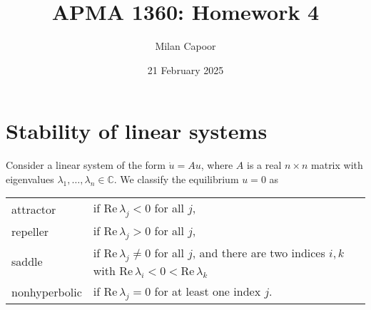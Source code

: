 \documentclass[12pt]{article}
\title{APMA 1360: Homework 4}
\author{Milan Capoor}
\date{21 February 2025}
\renewcommand{\Re}{\text{Re}\,}
\begin{document}
\maketitle
\section{Stability of linear systems}

Consider a linear system of the form $\dot{u}=Au$, where $A$ is a real $n\times n$ matrix with eigenvalues $\lambda_1,\ldots,\lambda_n\in\mathbb{C}$. We classify the equilibrium $u=0$ as\\
\hspace*{1in}\begin{tabular}{ll}
    attractor     & if $\Re\lambda_j<0$ for all $j$,                                                                       \\
    repeller      & if $\Re\lambda_j>0$ for all $j$,                                                                       \\
    saddle        & if $\Re\lambda_j\neq0$ for all $j$, and there are two indices $i,k$ with $\Re\lambda_i<0<\Re\lambda_k$ \\
    nonhyperbolic & if $\Re\lambda_j=0$ for at least one index $j$.
\end{tabular}
\end{document}
